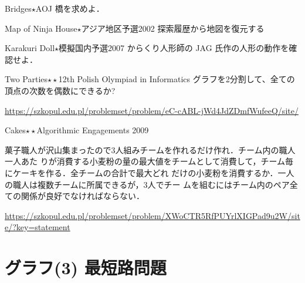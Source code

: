 \begin{pbox}{Bridges$\star$}{AOJ}
橋を求めよ．  

\end{pbox}

\begin{pbox}{Map of Ninja House$\star$}{アジア地区予選2002}
探索履歴から地図を復元する

\end{pbox}

\begin{pbox}{Karakuri Doll$\star$}{模擬国内予選2007}
からくり人形師の JAG 氏作の人形の動作を確認せよ．

\end{pbox}

\begin{pbox}{Two Parties$\star\star$}{12th Polish Olympiad in Informatics}
  グラフを2分割して、全ての頂点の次数を偶数にできるか?

\url{https://szkopul.edu.pl/problemset/problem/eC-cABL-jWd4JdZDmfWufeeQ/site/}
\end{pbox}

\begin{pbox}{Cakes$\star\star$}{Algorithmic Engagements 2009}

菓子職人が沢山集まったので3人組みチームを作れるだけ作れ．チーム内の職人一人あた
りが消費する小麦粉の量の最大値をチームとして消費して，チーム毎にケーキを作る．全チームの合計で最大どれ
だけの小麦粉を消費するか．一人の職人は複数チームに所属できるが，3人でチー
ムを組むにはチーム内のペア全ての関係が良好でなければならない．

\url{https://szkopul.edu.pl/problemset/problem/XWoCTR5RfPUYrlXIGPad9u2W/site/?key=statement}
\end{pbox}

 \chapter{グラフ(3) 最短路問題}\label{chapter:shortestpath}


